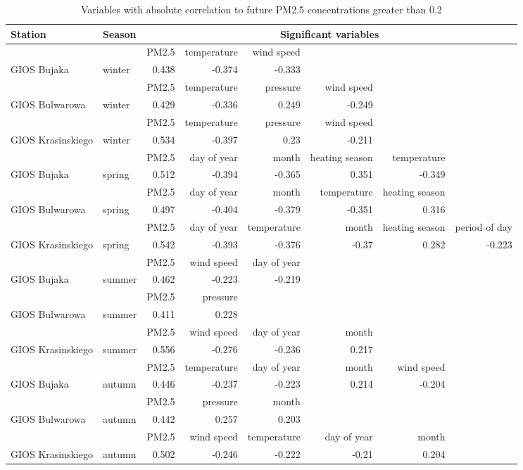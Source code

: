 \begin{landscape}
\begin{table}[H]
\centering
\footnotesize
\caption{Variables with absolute correlation to future PM2.5 concentrations greater than 0.2}
\label{tab:dataset-correlation-significant}
\begin{tabular}{llrrrrrr}
\toprule
Station & Season & \multicolumn{6}{c}{Significant variables} \\ \midrule
 &  & PM2.5 & temperature & wind speed &  &  &  \\
GIOS Bujaka & winter & 0.438 & -0.374 & -0.333 &  &  &  \\ \midrule
 &  & PM2.5 & temperature & pressure & wind speed &  &  \\
GIOS Bulwarowa & winter & 0.429 & -0.336 & 0.249 & -0.249 &  &  \\ \midrule
 &  & PM2.5 & temperature & pressure & wind speed &  &  \\
GIOS Krasinskiego & winter & 0.534 & -0.397 & 0.23 & -0.211 &  &  \\ \midrule
 &  & PM2.5 & day of year & month & heating season & temperature &  \\
GIOS Bujaka & spring & 0.512 & -0.394 & -0.365 & 0.351 & -0.349 &  \\ \midrule
 &  & PM2.5 & day of year & month & temperature & heating season &  \\
GIOS Bulwarowa & spring & 0.497 & -0.404 & -0.379 & -0.351 & 0.316 &  \\ \midrule
 &  & PM2.5 & day of year & temperature & month & heating season & period of day \\
GIOS Krasinskiego & spring & 0.542 & -0.393 & -0.376 & -0.37 & 0.282 & -0.223 \\ \midrule
 &  & PM2.5 & wind speed & day of year &  &  &  \\
GIOS Bujaka & summer & 0.462 & -0.223 & -0.219 &  &  &  \\ \midrule
 &  & PM2.5 & pressure &  &  &  &  \\
GIOS Bulwarowa & summer & 0.411 & 0.228 &  &  &  &  \\ \midrule
 &  & PM2.5 & wind speed & day of year & month &  &  \\
GIOS Krasinskiego & summer & 0.556 & -0.276 & -0.236 & 0.217 &  &  \\ \midrule
 &  & PM2.5 & temperature & day of year & month & wind speed &  \\
GIOS Bujaka & autumn & 0.446 & -0.237 & -0.223 & 0.214 & -0.204 &  \\ \bottomrule
 &  & PM2.5 & pressure & month &  &  &  \\
GIOS Bulwarowa & autumn & 0.442 & 0.257 & 0.203 &  &  &  \\ \midrule
 &  & PM2.5 & wind speed & temperature & day of year & month &  \\
GIOS Krasinskiego & autumn & 0.502 & -0.246 & -0.222 & -0.21 & 0.204 &  \\ \midrule
\end{tabular}
\end{table}
\end{landscape}